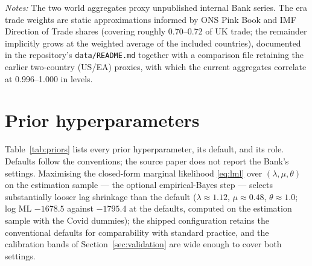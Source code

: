\begin{table}[h]
\begin{tabular}{p{1.9cm}p{3.8cm}p{3.3cm}p{4.5cm}}
\bottomrule
\end{tabular}
\par\smallskip
\parbox{0.97\textwidth}{\footnotesize \emph{Notes:} The two world aggregates proxy unpublished internal Bank series. The era trade weights are static approximations informed by ONS Pink Book and IMF Direction of Trade shares (covering roughly 0.70--0.72 of UK trade; the remainder implicitly grows at the weighted average of the included countries), documented in the repository's \texttt{data/README.md} together with a comparison file retaining the earlier two-country (US/EA) proxies, with which the current aggregates correlate at 0.996--1.000 in levels.}
\end{table}

\section{Prior hyperparameters}
\label{app:priors}

Table~\ref{tab:priors} lists every prior hyperparameter, its default, and its role. Defaults follow the \citet{giannone2015} conventions; the source paper does not report the Bank's settings. Maximising the closed-form marginal likelihood \eqref{eq:lml} over $(\lambda, \mu, \theta)$ on the estimation sample --- the optional empirical-Bayes step --- selects substantially looser lag shrinkage than the default ($\lambda \approx 1.12$, $\mu \approx 0.48$, $\theta \approx 1.0$; log ML $-1678.5$ against $-1795.4$ at the defaults, computed on the estimation sample with the Covid dummies); the shipped configuration retains the conventional defaults for comparability with standard practice, and the calibration bands of Section~\ref{sec:validation} are wide enough to cover both settings.

